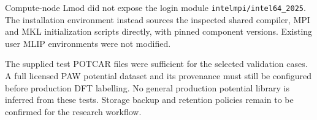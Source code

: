 \documentclass[10pt,a4paper]{article}
\begin{document}
Compute-node Lmod did not expose the login module
\texttt{intelmpi/intel64\_2025}. The installation environment instead sources
the inspected shared compiler, MPI and MKL initialization scripts directly,
with pinned component versions. Existing user MLIP environments were not modified.

The supplied test POTCAR files were sufficient for the selected validation
cases. A full licensed PAW potential dataset and its provenance must still be
configured before production DFT labelling. No general production potential
library is inferred from these tests. Storage backup and retention policies
remain to be confirmed for the research workflow.
\end{document}
